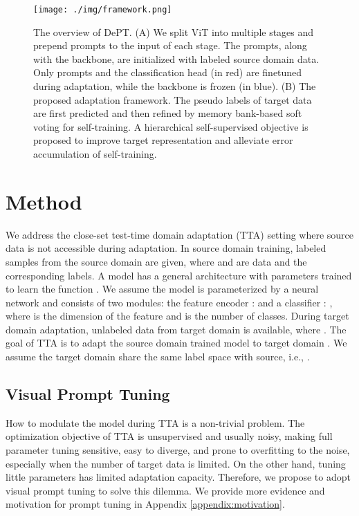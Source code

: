 \documentclass{article} \usepackage{iclr2023_conference,times}
\begin{document}
\begin{figure}[t]
\begin{center}
\texttt{[image: ./img/framework.png]}
\end{center}
\caption{The overview of DePT. (A) We split ViT into multiple stages and prepend prompts to the input of each stage. The prompts, along with the backbone, are initialized with labeled source domain data. Only prompts and the classification head (in red) are finetuned during adaptation,  while the backbone is frozen (in blue). (B) The proposed adaptation framework. The pseudo labels of target data are first predicted and then refined by memory bank-based soft voting for self-training. A hierarchical self-supervised objective is proposed to improve target representation and alleviate error accumulation of self-training.}
\label{fig:framework}
\end{figure}


\section{Method}
We address the close-set test-time domain adaptation (TTA) setting where source data is not accessible during adaptation. In source domain training,  labeled samples  from the source domain  are given, where  and  are data and the corresponding labels. A model has a general architecture with parameters  trained to learn the function . We assume the model is parameterized by a neural network and consists of two modules: the feature encoder :  and a classifier : , where  is the dimension of the feature and  is the number of classes. During target domain adaptation, unlabeled data  from target domain  is available, where . The goal of TTA is to adapt the source domain trained model  to target domain . We assume the target domain share the same label space with source, i.e., . 







\subsection{Visual Prompt Tuning}

How to modulate the model during TTA is a non-trivial problem. The optimization objective of TTA is unsupervised and usually noisy, making full parameter tuning sensitive, easy to diverge, and prone to overfitting to the noise, especially when the number of target data is limited. On the other hand, tuning little parameters has limited adaptation capacity. Therefore, we propose to adopt visual prompt tuning to solve this dilemma. We provide more evidence and motivation for prompt tuning in Appendix \ref{appendix:motivation}.
\end{document}
